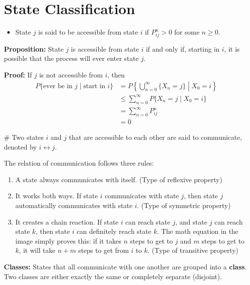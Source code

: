 \documentclass[12pt,a4paper]{article}
\date{}
\begin{document}
\setlength{\jot}{12pt} 

\vspace{-1.5cm}

\section*{\textcolor{secondary}{State Classification}}

\begin{itemize}
    \item State $j$ is said to be accessible from state $i$ if $P_{ij}^n > 0$ for some $n \ge 0$.
\end{itemize}

\textbf{Proposition:} State $j$ is accessible from state $i$ if and only if, starting in $i$, it is possible that the process will ever enter state $j$.

\textbf{Proof:} If $j$ is not accessible from $i$, then
\begin{align*}
    P\{\text{ever be in } j \mid \text{start in } i\} &= P\left\{ \bigcup_{n=0}^\infty \{X_n = j\} \middle| X_0 = i \right\} \\
    &\le \sum_{n=0}^\infty P\{X_n = j \mid X_0 = i\} \\
    &= \sum_{n=0}^\infty P_{ij}^n \\
    &= 0
\end{align*}

\# Two states $i$ and $j$ that are accessible to each other are said to communicate, denoted by $i \leftrightarrow j$.

The relation of communication follows three rules:
\begin{enumerate}
    \item A state always communicates with itself. (Type of reflexive property)
    \item It works both ways. If state $i$ communicates with state $j$, then state $j$ automatically communicates with state $i$. (Type of symmetric property)
    \item It creates a chain reaction. If state $i$ can reach state $j$, and state $j$ can reach state $k$, then state $i$ can definitely reach state $k$. The math equation in the image simply proves this: if it takes $n$ steps to get to $j$ and $m$ steps to get to $k$, it will take $n+m$ steps to get from $i$ to $k$. (Type of transitive property)
\end{enumerate}

\textbf{Classes:} States that all communicate with one another are grouped into a \textbf{class}. Two classes are either exactly the same or completely separate (disjoint).
\end{document}
